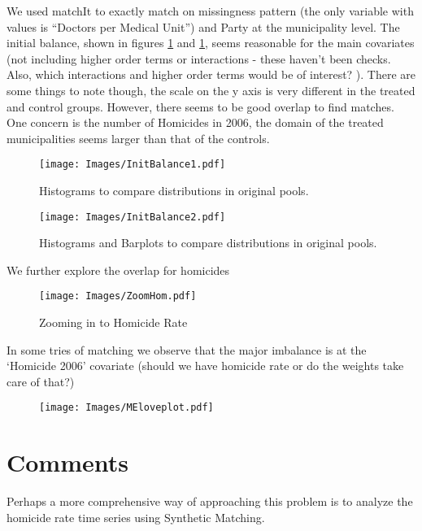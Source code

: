 \documentclass{article}[11 pt]
\begin{document}
We used matchIt to exactly match on missingness pattern (the only variable with values is ``Doctors per Medical Unit'') and Party at the municipality level. The initial balance, shown in figures \ref{initBalance1} and \ref{initBalance1}, seems reasonable for the main covariates (not including higher order terms or interactions - these haven't been checks. Also, which interactions and higher order terms would be of interest? ). There are some things to note though, the scale on the y axis is very different in the treated and control groups. However, there seems to be good overlap to find matches. One concern is the number of Homicides in 2006, the domain of the treated municipalities seems larger than that of the controls.

\begin{figure}[ht]

    \centering
        \texttt{[image: Images/InitBalance1.pdf]}
\caption{Histograms to compare distributions in original pools.}
\label{initBalance1}
\end{figure}

\begin{figure}[ht]

    \centering
        \texttt{[image: Images/InitBalance2.pdf]}
\caption{Histograms and Barplots  to compare distributions in original pools.}
\label{initBalance2}
\end{figure}

We further explore the overlap for homicides
\begin{figure}[ht]

    \centering
        \texttt{[image: Images/ZoomHom.pdf]}
\caption{Zooming in to Homicide Rate}
\label{ZoomHom}
\end{figure}

In some tries of matching we observe that the major imbalance is at the `Homicide 2006' covariate (should we have homicide rate or do the weights take care of that?)



\begin{figure}[ht]
    \centering
        \texttt{[image: Images/MEloveplot.pdf]}
\end{figure}

\section{Comments}
Perhaps a more comprehensive way of approaching this problem is to analyze the homicide rate time series using Synthetic Matching.

	
\end{document}
